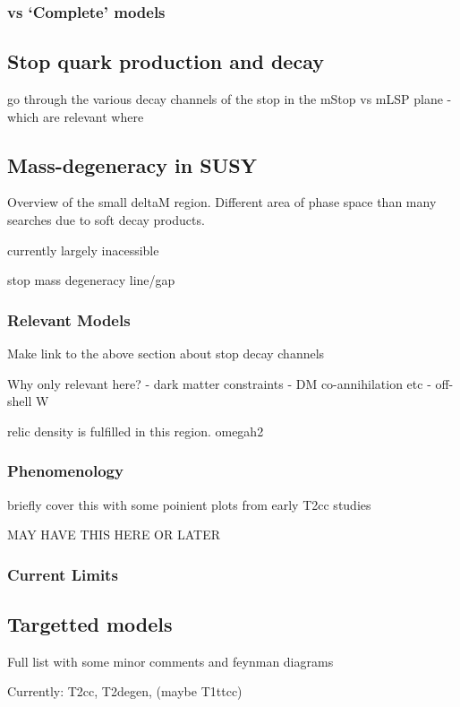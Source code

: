 \subsubsection{vs `Complete' models}

\subsection{Stop quark production and decay}
go through the various decay channels of the stop in the mStop vs mLSP plane
- which are relevant where

\subsection{Mass-degeneracy in SUSY}
Overview of the small deltaM region. Different area of phase space than many searches due to soft decay 
products.

currently largely inacessible

stop mass degeneracy line/gap

\subsubsection{Relevant Models}
Make link to the above section about stop decay channels

Why only relevant here?
- dark matter constraints - DM co-annihilation etc
- off-shell W

relic density is fulfilled in this region. omegah2

\subsubsection{Phenomenology}
briefly cover this with some poinient plots from early T2cc studies

MAY HAVE THIS HERE OR LATER
\subsubsection{Current Limits}

\subsection{Targetted models}
Full list with some minor comments and feynman diagrams

Currently: T2cc, T2degen, (maybe T1ttcc)